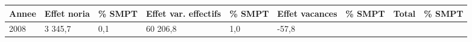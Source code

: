 \begin{longtable}[]{@{}lllllllll@{}}
\toprule
\begin{minipage}[b]{0.05\columnwidth}\raggedright
Annee\strut
\end{minipage} & \begin{minipage}[b]{0.10\columnwidth}\raggedright
Effet noria\strut
\end{minipage} & \begin{minipage}[b]{0.06\columnwidth}\raggedright
\% SMPT\strut
\end{minipage} & \begin{minipage}[b]{0.17\columnwidth}\raggedright
Effet var. effectifs\strut
\end{minipage} & \begin{minipage}[b]{0.06\columnwidth}\raggedright
\% SMPT\strut
\end{minipage} & \begin{minipage}[b]{0.12\columnwidth}\raggedright
Effet vacances\strut
\end{minipage} & \begin{minipage}[b]{0.06\columnwidth}\raggedright
\% SMPT\strut
\end{minipage} & \begin{minipage}[b]{0.08\columnwidth}\raggedright
Total\strut
\end{minipage} & \begin{minipage}[b]{0.06\columnwidth}\raggedright
\% SMPT\strut
\end{minipage}\tabularnewline
\midrule
\endhead
\begin{minipage}[t]{0.05\columnwidth}\raggedright
2008\strut
\end{minipage} & \begin{minipage}[t]{0.10\columnwidth}\raggedright
3 345,7\strut
\end{minipage} & \begin{minipage}[t]{0.06\columnwidth}\raggedright
0,1\strut
\end{minipage} & \begin{minipage}[t]{0.17\columnwidth}\raggedright
60 206,8\strut
\end{minipage} & \begin{minipage}[t]{0.06\columnwidth}\raggedright
1,0\strut
\end{minipage} & \begin{minipage}[t]{0.12\columnwidth}\raggedright
-57,8\strut
\end{minipage} & \begin{minipage}[t]{0.06\columnwidth}\raggedright

\end{minipage}
\end{longtable}

